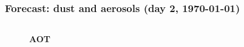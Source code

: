 \documentclass[aspectratio=169, 10pt]{beamer}
\begin{document}
\begin{frame}
\frametitle{Forecast: dust and aerosols (day 2, {\AdvanceDate[+2]\today})}

\begin{columns}
\begin{column}{0.33\textwidth}


\vspace{-3.5cm}
\begin{figure}
\textbf{AOT} \vspace{0.0cm}\\
\end{figure}


\end{column}
\end{columns}
\end{frame}
\end{document}
